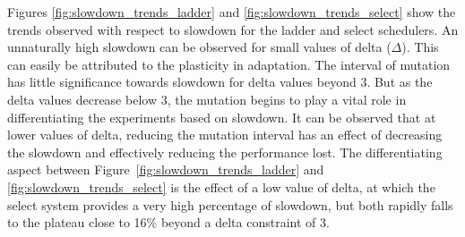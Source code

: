 Figures \ref{fig:slowdown_trends_ladder} and \ref{fig:slowdown_trends_select} show the trends
observed with respect to slowdown for the ladder and select schedulers. An unnaturally 
high slowdown can be observed for small values of delta ($\Delta$). This can easily be attributed
to the plasticity in adaptation. The interval of mutation has little significance towards slowdown
for delta values beyond 3. But as the delta values decrease below 3, the mutation begins to play a vital 
role in differentiating the experiments based on slowdown. It can be observed that at lower values
of delta, reducing the mutation interval has an effect of decreasing the slowdown and effectively 
reducing the performance lost. The differentiating aspect between Figure~\ref{fig:slowdown_trends_ladder} 
and \ref{fig:slowdown_trends_select} is the effect of a low value of delta, at which the select system
provides a very high percentage of slowdown, but both rapidly falls to the plateau close to 16\% beyond 
a delta constraint of 3. 


